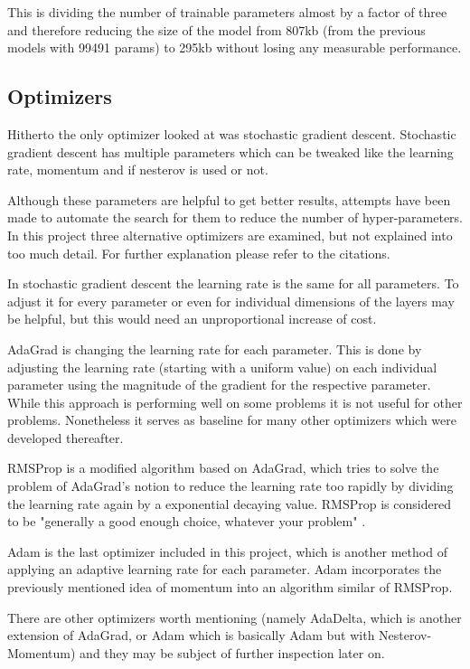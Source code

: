 This is dividing the number of trainable parameters almost by a factor of three and therefore reducing the size of the model from 807kb (from the previous models with 99491 params) to 295kb without losing any measurable performance.

\subsection{Optimizers}

Hitherto the only optimizer looked at was stochastic gradient descent.
Stochastic gradient descent has multiple parameters which can be tweaked like the learning rate, momentum and if nesterov is used or not.

Although these parameters are helpful to get better results, attempts have been made to automate the search for them to reduce the number of hyper-parameters.
In this project three alternative optimizers are examined, but not explained into too much detail. For further explanation please refer to the citations.

In stochastic gradient descent the learning rate is the same for all parameters.
To adjust it for every parameter or even for individual dimensions of the layers may be helpful, but this would need an unproportional increase of cost.

AdaGrad \cite{Duchi2010} is changing the learning rate for each parameter.
This is done by adjusting the learning rate (starting with a uniform value) on each individual parameter using the magnitude of the gradient for the respective parameter.
While this approach is performing well on some problems it is not useful for other problems.
Nonetheless it serves as baseline for many other optimizers which were developed thereafter.

RMSProp \cite{Hinton2012} is a modified algorithm based on AdaGrad, which tries to solve the problem of AdaGrad's notion to reduce the learning rate too rapidly by dividing the learning rate again by a exponential decaying value.
RMSProp is considered to be "generally a good enough choice, whatever your problem" \cite[p.77]{Chollet2017}.

Adam \cite{Kingma2014}\cite{Reddi2018} is the last optimizer included in this project, which is another method of applying an adaptive learning rate for each parameter.
Adam incorporates the previously mentioned idea of momentum into an algorithm similar of RMSProp.

There are other optimizers worth mentioning (namely AdaDelta, which is another extension of AdaGrad, or Adam which is basically Adam but with Nesterov-Momentum) and they may be subject of further inspection later on.

